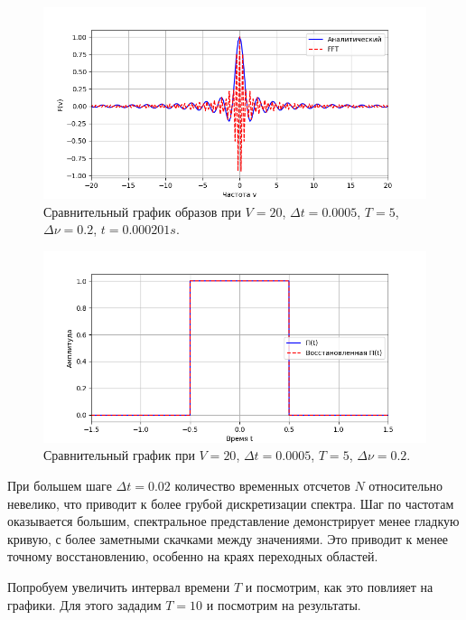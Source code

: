 \documentclass[a4paper]{article}
\begin{document}
\begin{figure}[H]
  \centering
  \includegraphics[width=\textwidth]{src/task_1_2/freq_5_0.0005_20_0.2.png}
  \caption{Сравнительный график образов при $V=20$, $\Delta t=0.0005$, $T=5$, $\Delta \nu=0.2$, $t=0.000201 s$.} 
\end{figure}
\begin{figure}[H]
  \centering
  \includegraphics[width=\textwidth]{src/task_1_2/time_5_0.0005_20_0.2.png}
  \caption{Сравнительный график при $V=20$, $\Delta t=0.0005$, $T=5$, $\Delta \nu=0.2$.} 
\end{figure}

\noindent При большем шаге $\Delta t = 0.02$ количество временных отсчетов $N$ относительно невелико, что приводит к более грубой дискретизации спектра. Шаг по частотам оказывается большим, спектральное представление  демонстрирует менее гладкую кривую, с более заметными скачками между значениями. Это приводит к менее точному восстановлению, особенно на краях переходных областей.

Попробуем увеличить интервал времени $T$ и посмотрим, как это повлияет на графики. Для этого зададим $T=10$ и посмотрим на результаты.
\end{document}
